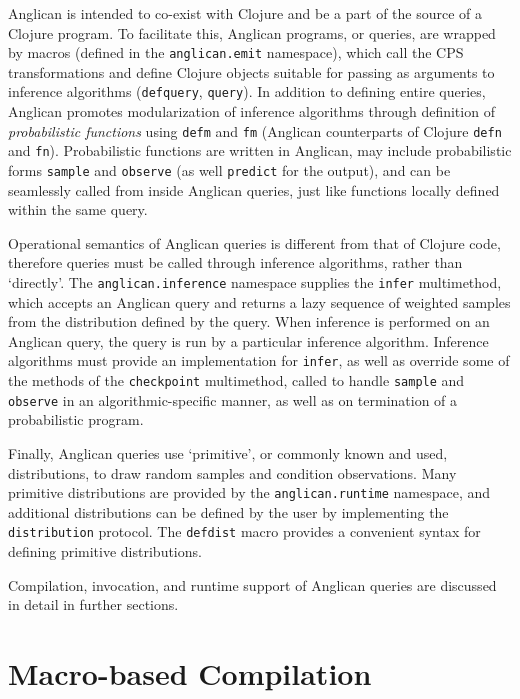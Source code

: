 \documentclass[preprint]{sigplanconf}
\begin{document}
Anglican is intended to co-exist with Clojure and be a part of
the source of a Clojure program. To facilitate this, Anglican
programs, or queries, are wrapped by macros (defined in the
\texttt{anglican.emit} namespace), which call the CPS
transformations and define Clojure objects suitable for passing
as arguments to inference algorithms (\texttt{defquery},
\texttt{query}). In addition to defining entire queries,
Anglican promotes modularization of inference algorithms through
definition of \textit{probabilistic functions} using
\texttt{defm} and \texttt{fm} (Anglican counterparts of Clojure
\texttt{defn} and \texttt{fn}). Probabilistic functions are
written in Anglican, may include probabilistic forms
\texttt{sample} and \texttt{observe} (as well \texttt{predict}
for the output), and can be seamlessly called from inside
Anglican queries, just like functions locally defined within the
same query.

Operational semantics of Anglican queries is different from that
of Clojure code, therefore queries must be called through
inference algorithms, rather than `directly'.  The
\texttt{anglican.inference} namespace supplies the
\texttt{infer} multimethod, which accepts an Anglican query and
returns a lazy sequence of weighted samples from the
distribution defined by the query.  When inference
is performed on an Anglican query, the query is run by a
particular inference algorithm. Inference algorithms must
provide an implementation for \texttt{infer}, as well as
override some of the methods of the \texttt{checkpoint}
multimethod, called to handle \texttt{sample} and
\texttt{observe} in an algorithmic-specific manner, as well
as on termination of a probabilistic program.

Finally, Anglican queries use `primitive', or commonly known
and used, distributions, to draw random samples and condition
observations. Many primitive distributions are provided by the
\texttt{anglican.runtime} namespace, and additional
distributions can be defined by the user by implementing the
\texttt{distribution} protocol. The \texttt{defdist} macro
provides a convenient syntax for defining primitive distributions.

Compilation, invocation, and runtime support of Anglican queries
are discussed in detail in further sections.

\section{Macro-based Compilation}
\end{document}
